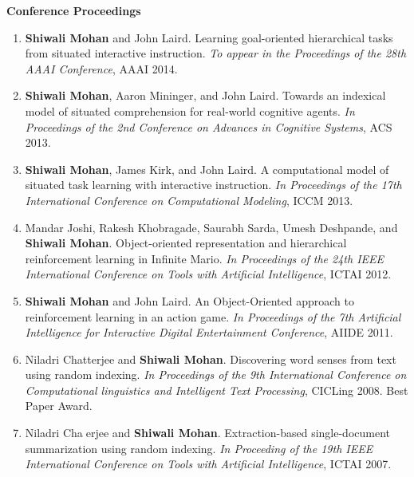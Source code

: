 \documentclass[margin,line,11pt]{res}
\begin{document}
\begin{resume}
\textbf{Conference Proceedings}
\begin{enumerate}[label=\lbrack C\arabic*\rbrack,leftmargin=*]
\item \textbf{Shiwali Mohan} and John Laird. Learning goal-oriented hierarchical tasks from situated interactive instruction. \emph{To appear in the Proceedings of the 28th AAAI Conference}, AAAI 2014.
\item \textbf{Shiwali Mohan}, Aaron Mininger, and John Laird. Towards an indexical model of situated comprehension for real-world cognitive agents. \emph{In Proceedings of the 2nd Conference on Advances in Cognitive Systems}, ACS 2013.
\item \textbf{Shiwali Mohan}, James Kirk, and John Laird. A computational model of situated task learning with interactive instruction. \emph{In Proceedings of the 17th International Conference on Computational Modeling}, ICCM 2013.
\item Mandar Joshi, Rakesh Khobragade, Saurabh Sarda, Umesh Deshpande, and \textbf{Shiwali Mohan}. Object-oriented
representation and hierarchical reinforcement learning in Infinite Mario. \emph{In Proceedings of the 24th IEEE
International Conference on Tools with Artificial Intelligence}, ICTAI 2012.
\item \textbf{Shiwali Mohan} and John Laird. An Object-Oriented approach to reinforcement learning in an action game.
\emph{In Proceedings of the 7th Artificial Intelligence for Interactive Digital Entertainment Conference}, AIIDE 2011.
\item Niladri Chatterjee and \textbf{Shiwali Mohan}. Discovering word senses from text using random indexing. \emph{In
Proceedings of the 9th International Conference on Computational linguistics and Intelligent Text Processing},
CICLing 2008. Best Paper Award.
\item Niladri Chaerjee and \textbf{Shiwali Mohan}. Extraction-based single-document summarization using random
indexing. \emph{In Proceeding of the 19th IEEE International Conference on Tools with Artificial Intelligence}, ICTAI
2007.
\end{enumerate}


\end{resume}
\end{document}
